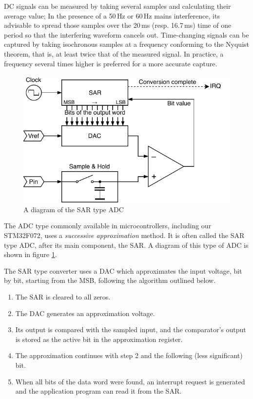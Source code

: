 \gls{DC} signals can be measured by taking several samples and calculating their average value; In the presence of a 50\,Hz or 60\,Hz mains interference, its advisable to spread those samples over the 20\,ms (resp. 16.7\,ms) time of one period so that the interfering waveform cancels out. Time-changing signals can be captured by taking isochronous samples at a frequency conforming to the Nyquist theorem, that is, at least twice that of the measured signal. In practice, a frequency several times higher is preferred for a more accurate capture.

\begin{figure}
	\centering
	\includegraphics[scale=1] {img/sar-adc.pdf}
	\caption{\label{fig:adc-sar}A diagram of the SAR type ADC}
\end{figure}

The \gls{ADC} type commonly available in microcontrollers, including our STM32F072, uses a \textit{successive approximation} method. It is often called the SAR type \gls{ADC}, after its main component, the \gls{SAR}. A diagram of this type of \gls{ADC} is shown in figure \ref{fig:adc-sar}.

The \gls{SAR} type converter uses a \gls{DAC} which approximates the input voltage, bit by bit, starting from the MSB, following the algorithm outlined below.

\begin{enumerate}
	\item The \gls{SAR} is cleared to all zeros.
	\item The \gls{DAC} generates an approximation voltage.
	\item Its output is compared with the sampled input, and the comparator's output is stored as the active bit in the approximation register.
	\item The approximation continues with step 2 and the following (less significant) bit.
	\item When all bits of the data word were found, an interrupt request is generated and the application program can read it from the \gls{SAR}.
\end{enumerate}

